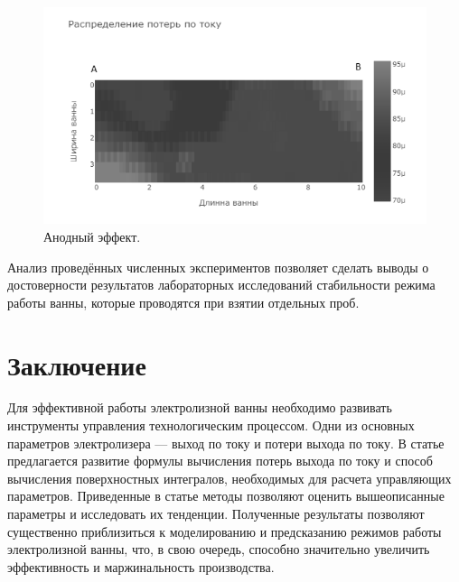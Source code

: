 \documentclass{article}
\begin{document}
\begin{figure}[H]
    \centering
    \includegraphics[width=150mm]{анодный эффект.png}
    \caption{Анодный эффект.}
    \label{fig:} 
\end{figure}

Анализ проведённых численных экспериментов позволяет сделать выводы о достоверности результатов лабораторных исследований стабильности режима работы ванны, которые проводятся при взятии отдельных проб.

\section{Заключение}

Для эффективной работы электролизной ванны необходимо развивать инструменты управления технологическим процессом. Одни из основных параметров электролизера — выход по току и потери выхода по току. В статье предлагается развитие формулы вычисления потерь выхода по току и способ вычисления поверхностных интегралов, необходимых для расчета управляющих параметров. Приведенные в статье методы позволяют оценить вышеописанные параметры и исследовать их тенденции. Полученные результаты позволяют существенно приблизиться к моделированию и предсказанию режимов работы электролизной ванны, что, в свою очередь, способно значительно увеличить эффективность и маржинальность производства.

\begin{thebibliography}{}
\end{thebibliography}
\end{document}
